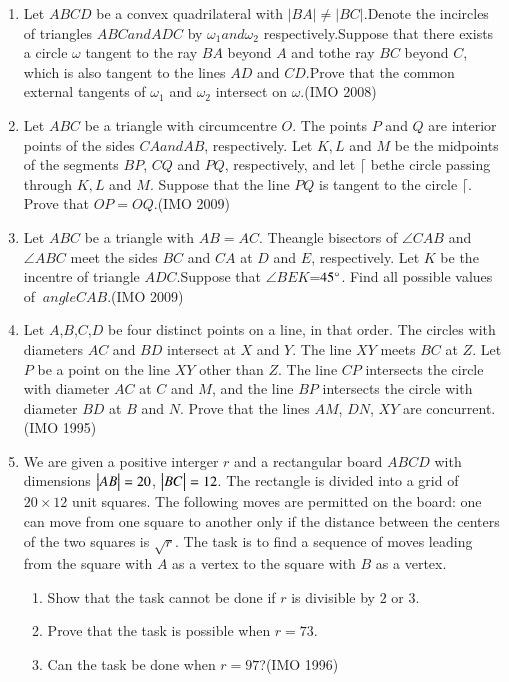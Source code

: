 \begin{enumerate}
	\item Let $ABCD$ be a convex quadrilateral with $|BA| \neq |BC|$.Denote the incircles of triangles $ABC and ADC$ by $\omega_{1} and \omega_{2}$ respectively.Suppose that there exists a circle $\omega$ tangent to the ray $BA$ beyond $A$ and tothe ray $BC$ beyond $C$, which is also tangent to the lines $AD$ and $CD$.Prove that the common external tangents of $\omega_{1}$ and $\omega_{2}$ intersect on $\omega$.\hfill(IMO 2008)
		\item Let $ABC$ be a triangle with circumcentre $O$. The points $P$ and $Q$ are interior points of the sides $CA and AB$, respectively. Let $K,L$ and $M$ be the midpoints of the segments $BP$, $CQ$ and $PQ$, respectively, and let $\lceil$ bethe circle passing through $K,L$ and $M$. Suppose that the line $PQ$ is tangent to the circle $\lceil$. Prove that $OP=OQ$.\hfill(IMO 2009)
	\item Let $ABC$ be a triangle with $AB=AC$. Theangle bisectors of $\angle CAB$ and $\angle ABC$ meet the sides $BC$ and $CA$ at $D$ and $E$, respectively. Let $K$ be the incentre of triangle $ADC$.Suppose that $ \angle BEK$=$45\degree$. Find all possible values of $\ angle CAB$.\hfill(IMO 2009)
	\item Let $A$,$B$,$C$,$D$ be four distinct points on a line, in that order. The circles with diameters $AC$ and $BD$ intersect at $X$ and $Y$. The line $XY$ meets $BC$ at $Z$. Let $P$ be a point on the line $XY$ other than $Z$. The line $CP$ intersects the circle with diameter $AC$ at $C$ and $M$, and the line $BP$ intersects the circle with diameter $BD$ at $B$ and $N$. Prove that the lines $AM$, $DN$, $XY$ are concurrent.\hfill(IMO 1995)
\item  We are given a positive interger $r$ and a rectangular board $ABCD$ with dimensions $\begin{vmatrix}AB\end{vmatrix} =20$, $\begin{vmatrix}BC\end{vmatrix}=12$. The rectangle is divided into a grid of $20\times12$ unit squares. The following moves are permitted on the board: one can move from one square to another only if the distance between the centers of the two squares is $\sqrt{r}$. The task is to find a sequence of moves leading from the square with $A$ as a vertex to the square with $B$ as a vertex.
\begin{enumerate}
\item Show that the task cannot be done if $r$ is divisible by $2$ or $3$.
 \item Prove that the task is possible when $r=73$.
 \item Can the task be done when $r=97$?\hfill(IMO 1996)
\end{enumerate}

\end{enumerate}
